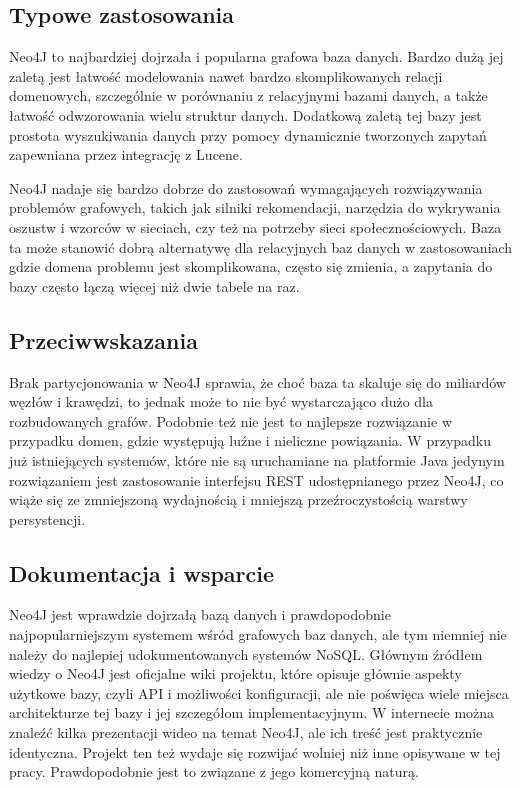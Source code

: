 \subsection*{Typowe zastosowania}

Neo4J to najbardziej dojrzała i popularna grafowa baza danych.
Bardzo dużą jej zaletą jest łatwość modelowania nawet bardzo skomplikowanych relacji domenowych, szczególnie w porównaniu z relacyjnymi bazami danych, a także łatwość odwzorowania wielu struktur danych.
Dodatkową zaletą tej bazy jest prostota wyszukiwania danych przy pomocy dynamicznie tworzonych zapytań zapewniana przez integrację z Lucene.

Neo4J nadaje się bardzo dobrze do zastosowań wymagających rozwiązywania problemów grafowych, takich jak silniki rekomendacji, narzędzia do wykrywania oszustw i wzorców w sieciach, czy też na potrzeby sieci społecznościowych.
Baza ta może stanowić dobrą alternatywę dla relacyjnych baz danych w zastosowaniach gdzie domena problemu jest skomplikowana, często się zmienia, a zapytania do bazy często łączą więcej niż dwie tabele na raz.

\subsection*{Przeciwwskazania}

Brak partycjonowania w Neo4J sprawia, że choć baza ta skaluje się do miliardów węzłów i krawędzi, to jednak może to nie być wystarczająco dużo dla rozbudowanych grafów.
Podobnie też nie jest to najlepsze rozwiązanie w przypadku domen, gdzie występują luźne i nieliczne powiązania.
W przypadku już istniejących systemów, które nie są uruchamiane na platformie Java jedynym rozwiązaniem jest zastosowanie interfejsu REST udostępnianego przez Neo4J, co wiąże się ze zmniejszoną wydajnością i mniejszą przeźroczystością warstwy persystencji.

\subsection*{Dokumentacja i wsparcie}

Neo4J jest wprawdzie dojrzałą bazą danych i prawdopodobnie najpopularniejszym systemem wśród grafowych baz danych, ale tym niemniej nie należy do najlepiej udokumentowanych systemów NoSQL.
Głównym źródłem wiedzy o Neo4J jest oficjalne wiki projektu, które opisuje głównie aspekty użytkowe bazy, czyli API i możliwości konfiguracji, ale nie poświęca wiele miejsca architekturze tej bazy i jej szczegółom implementacyjnym.
W internecie można znaleźć kilka prezentacji wideo na temat Neo4J, ale ich treść jest praktycznie identyczna.
Projekt ten też wydaje się rozwijać wolniej niż inne opisywane w tej pracy.
Prawdopodobnie jest to związane z jego komercyjną naturą.

